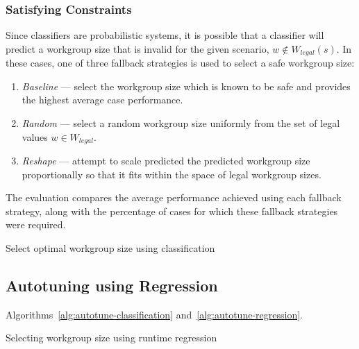 \subsubsection{Satisfying Constraints}

Since classifiers are probabilistic systems, it is possible that a
classifier will predict a workgroup size that is invalid for the given
scenario, $w \not\in W_{legal}(s)$. In these cases, one of three
fallback strategies is used to select a safe workgroup size:

\begin{enumerate}
\item \emph{Baseline} --- select the workgroup size which is known to be
  safe and provides the highest average case performance.
\item \emph{Random} --- select a random workgroup size uniformly from
  the set of legal values $w \in W_{legal}$.
\item \emph{Reshape} --- attempt to scale predicted the predicted
  workgroup size proportionally so that it fits within the space of
  legal workgroup sizes.
\end{enumerate}

The evaluation compares the average performance achieved using each
fallback strategy, along with the percentage of cases for which these
fallback strategies were required.

\begin{algorithm}

\caption{Select optimal workgroup size using classification}
\label{alg:autotune-classification}
\end{algorithm}


\subsection{Autotuning using Regression}



Algorithms~\ref{alg:autotune-classification} and~\ref{alg:autotune-regression}.

\begin{algorithm}

\caption{Selecting workgroup size using runtime regression}
\label{alg:autotune-runtime-regression}
\end{algorithm}

